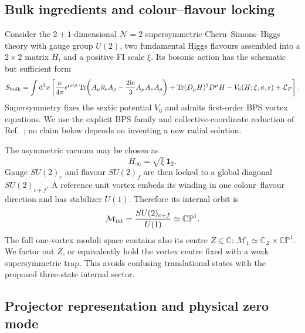 \documentclass[11pt]{article}
\theoremstyle{definition}
\theoremstyle{remark}
\newcommand{\ii}{\mathrm i}
\newcommand{\dd}{\mathrm d}
\newcommand{\CC}{\mathbb C}
\newcommand{\CP}{\mathbb {CP}}
\newcommand{\cM}{\mathcal M}
\newcommand{\Tr}{\operatorname{Tr}}
\begin{document}
\subsection{Bulk ingredients and colour--flavour locking}

Consider the \(2+1\)-dimensional \(\mathcal N=2\) supersymmetric
Chern--Simons--Higgs theory with gauge group \(U(2)\), two fundamental Higgs
flavours assembled into a \(2\times2\) matrix \(H\), and a positive FI scale
\(\xi\).  Its bosonic action has the schematic but sufficient form
\begin{equation}
 S_{\rm bulk}=\int\dd^3x\left[
 \frac{\kappa}{4\pi}\epsilon^{\mu\nu\rho}
 \Tr\!\left(A_\mu\partial_\nu A_\rho-
 \frac{2\ii e}{3}A_\mu A_\nu A_\rho\right)
 +\Tr(D_\mu H)^\dagger D^\mu H-V_6(H;\xi,\kappa,e)
 +\mathcal L_F\right].
 \label{eq:bulk-action}
\end{equation}
Supersymmetry fixes the sextic potential \(V_6\) and admits first-order BPS
vortex equations.  We use the explicit BPS family and collective-coordinate
reduction of Ref.~\cite{AldrovandiSchaposnik2007APE4SQM}; no claim below
depends on inventing a new radial solution.

The asymmetric vacuum may be chosen as
\begin{equation}
 H_\infty=\sqrt\xi\,\bm 1_2.
 \label{eq:locked-vacuum}
\end{equation}
Gauge \(SU(2)_c\) and flavour \(SU(2)_f\) are then locked to a global
diagonal \(SU(2)_{c+f}\).  A reference unit vortex embeds its winding in one
colour--flavour direction and has stabilizer \(U(1)\).  Therefore its
internal orbit is
\begin{equation}
 \cM_{\rm int}=\frac{SU(2)_{c+f}}{U(1)}\simeq\CP^1.
 \label{eq:orbit}
\end{equation}
The full one-vortex moduli space contains also its centre
\(Z\in\CC\): \(\cM_1\simeq\CC_Z\times\CP^1\).  We factor out \(Z\), or
equivalently hold the vortex centre fixed with a weak supersymmetric trap.
This avoids confusing translational states with the proposed three-state
internal sector.

\subsection{Projector representation and physical zero mode}
\end{document}
